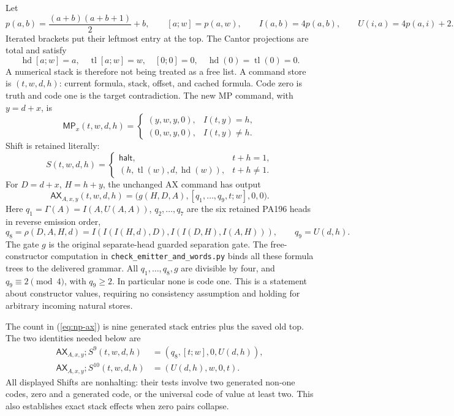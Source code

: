 Let
\[
 p(a,b)=\frac{(a+b)(a+b+1)}2+b,\qquad [a;w]=p(a,w),\qquad
 I(a,b)=4p(a,b),\qquad U(i,a)=4p(a,i)+2.
\]
Iterated brackets put their leftmost entry at the top. The Cantor
projections are total and satisfy
\[
 \operatorname{hd}[a;w]=a,\quad \operatorname{tl}[a;w]=w,
 \quad[0;0]=0,\quad\operatorname{hd}(0)=\operatorname{tl}(0)=0.
\]
A numerical stack is therefore not being treated as a free list.
A command store is $(t,w,d,h)$: current formula, stack, offset, and cached
formula. Code zero is truth and code one is the target contradiction.
The new MP command, with $y=d+x$, is
\begin{equation}\label{eq:np-mp}
 \mathsf{MP}_x(t,w,d,h)=
 \begin{cases}
 (y,w,y,0),& I(t,y)=h,\\
 (0,w,y,0),& I(t,y)\ne h.
 \end{cases}
\end{equation}
Shift is retained literally:
\begin{equation}\label{eq:np-shift}
 S(t,w,d,h)=
 \begin{cases}
 \mathsf{halt},&t+h=1,\\
 (h,\operatorname{tl}(w),d,\operatorname{hd}(w)),&t+h\ne1.
 \end{cases}
\end{equation}
For $D=d+x$, $H=h+y$, the unchanged AX command has output
\begin{equation}\label{eq:np-ax}
 \mathsf{AX}_{A,x,y}(t,w,d,h)
   =\bigl(g(H,D,A),[q_1,\ldots,q_9,t;w],0,0\bigr).
\end{equation}
Here $q_1=\Gamma(A)=I(A,U(A,A))$, $q_2,\ldots,q_7$ are the
six retained PA196 heads in reverse emission order,
\[
 q_8=\rho(D,A,H,d)=I(I(I(H,d),D),I(I(D,H),I(A,H))),
 \qquad q_9=U(d,h).
\]
The gate $g$ is the original separate-head guarded separation gate.
The free-constructor computation in
\texttt{check\_emitter\_and\_words.py} binds all these formula trees to
the delivered grammar. All $q_1,\ldots,q_8,g$ are divisible by four,
and $q_9\equiv2\pmod4$, with $q_9\ge2$. In particular none is code one.
This is a statement about constructor values, requiring no consistency
assumption and holding for arbitrary incoming natural stores.

The count in (\ref{eq:np-ax}) is nine generated stack entries plus the
saved old top. The two identities needed below are
\begin{align}
 \mathsf{AX}_{A,x,y};S^9(t,w,d,h)
   &=(q_8,[t;w],0,U(d,h)),\label{eq:np-nine}\\
 \mathsf{AX}_{A,x,y};S^{10}(t,w,d,h)
   &=(U(d,h),w,0,t).\label{eq:np-ten}
\end{align}
All displayed Shifts are nonhalting: their tests involve two generated
non-one codes, zero and a generated code, or the universal code of value
at least two. This also establishes exact stack effects when zero pairs
collapse.

